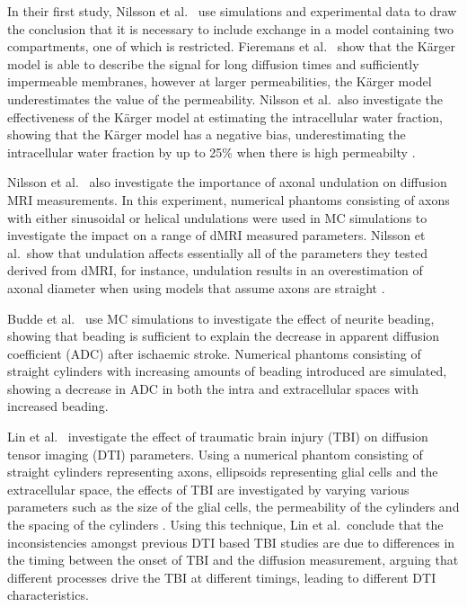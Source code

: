 In their first study, Nilsson et al.\ \cite{Nilsson2009} use simulations and experimental data to draw the conclusion that it is necessary to include exchange in a model containing two compartments, one of which is restricted. 
Fieremans et al.\ \cite{Fieremans2010} show that the K\"arger model is able to describe the signal for long diffusion times and sufficiently impermeable membranes, however at larger permeabilities, the K\"arger model underestimates the value of the permeability.
Nilsson et al.\ also investigate the effectiveness of the K\"arger model at estimating the intracellular water fraction, showing that the K\"arger model has a negative bias, underestimating the intracellular water fraction by up to 25\% when there is high permeabilty \cite{Nilsson2010}.

Nilsson et al.\ \cite{Nilsson2012} also investigate the importance of axonal undulation on diffusion MRI measurements.
In this experiment, numerical phantoms consisting of axons with either sinusoidal or helical undulations were used in MC simulations to investigate the impact on a range of dMRI measured parameters.
Nilsson et al.\ show that undulation affects essentially all of the parameters they tested derived from dMRI, for instance, undulation results in an overestimation of axonal diameter when using models that assume axons are straight \cite{Nilsson2012}. 

Budde et al.\ \cite{Budde2010} use MC simulations to investigate the effect of neurite beading, showing that beading is sufficient to explain the decrease in apparent diffusion coefficient (ADC) after ischaemic stroke. Numerical phantoms consisting of straight cylinders with increasing amounts of beading introduced are simulated, showing a decrease in ADC in both the intra and extracellular spaces with increased beading. 

Lin et al.\ \cite{Lin2016} investigate the effect of traumatic brain injury (TBI) on diffusion tensor imaging (DTI) parameters.
Using a numerical phantom consisting of straight cylinders representing axons, ellipsoids representing glial cells and the extracellular space, the effects of TBI are investigated by varying various parameters such as the size of the glial cells, the permeability of the cylinders and the spacing of the cylinders \cite{Lin2016}. 
Using this technique, Lin et al.\ conclude that the inconsistencies amongst previous DTI based TBI studies \cite{Huisman2004,Bazarian2007,Rutgers2008} are due to differences in the timing between the onset of TBI and the diffusion measurement, arguing that different processes drive the TBI at different timings, leading to different DTI characteristics. 

